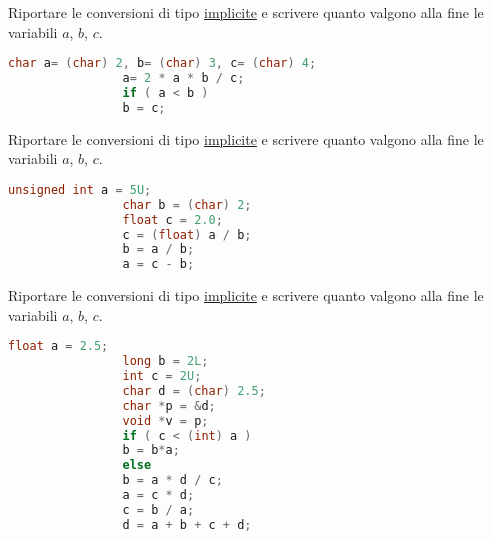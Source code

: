 \documentclass[addpoints,11pt]{exam}
\begin{document}
	\boxedpoints
	\begin{center}
	\end{center}
	
	\vspace{5mm}
	
	\noindent{}
	
	
	
	\begin{questions} 
		
		\question[1]
		Riportare le conversioni di tipo \underline{implicite} e scrivere quanto valgono alla fine le variabili $a$, $b$, $c$.
		
		\begin{minipage}[t]{0.5\linewidth}
			\begin{lstlisting}[language=C]
				char a= (char) 2, b= (char) 3, c= (char) 4;
				a= 2 * a * b / c;
				if ( a < b ) 
				b = c;
			\end{lstlisting}
		\end{minipage}
		\begin{minipage}[t]{0.5\linewidth}
			\makeemptybox{50pt}
		\end{minipage}
		
		
		
		\question[2]
		Riportare le conversioni di tipo \underline{implicite} e scrivere quanto valgono alla fine le variabili $a$, $b$, $c$.
		
		\begin{minipage}[t]{0.5\linewidth}
			\begin{lstlisting}[language=C]
				unsigned int a = 5U;
				char b = (char) 2;
				float c = 2.0;
				c = (float) a / b;
				b = a / b;
				a = c - b;
			\end{lstlisting}
		\end{minipage}
		\begin{minipage}[t]{0.5\linewidth}
			\makeemptybox{70pt}
		\end{minipage}
		
		
		
		\question[3]
		Riportare le conversioni di tipo \underline{implicite} e scrivere quanto valgono alla fine le variabili $a$, $b$, $c$.
		
		\begin{minipage}[t]{0.5\linewidth}
			\begin{lstlisting}[language=C]
				float a = 2.5;
				long b = 2L;
				int c = 2U;
				char d = (char) 2.5;
				char *p = &d;
				void *v = p;
				if ( c < (int) a )
				b = b*a;
				else
				b = a * d / c;
				a = c * d;
				c = b / a;
				d = a + b + c + d;
				

\end{lstlisting}
\end{minipage}
\end{questions}
\end{document}
